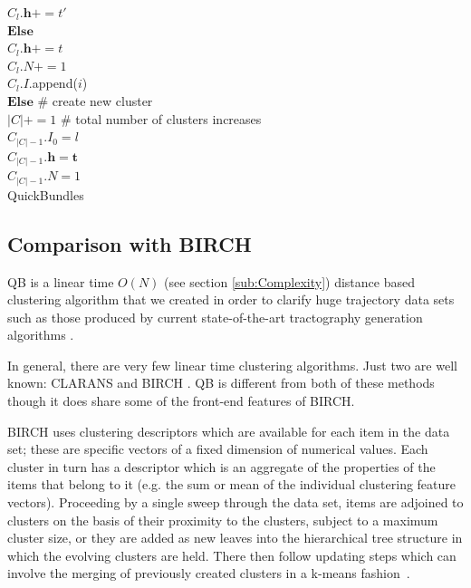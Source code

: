 \documentclass[preprint,authoryear,a4paper,10pt,onecolumn]{elsarticle}
\begin{document}
\begin{appendices}
\begin{algorithm}
\hspace*{4em} $C_{l}.\mathbf{h}+=t'$\\
\hspace*{2em} $\textbf{Else}$ \\
\hspace*{4em} $C_{l}.\mathbf{h}+=t$\\
\hspace*{2em} $C_{l}.N+=1$\\
\hspace*{2em} $C_{l}.I$.append($i$)\\
$\textbf{Else}$ \# create new cluster\\
\hspace*{2em} $|C|+=1$ \# total number of clusters increases\\
\hspace*{2em} $C_{|C|-1}.I_{0}=l$\\
\hspace*{2em} $C_{|C|-1}.\mathbf{h}=\mathbf{t}$\\
\hspace*{2em} $C_{|C|-1}.N=1$\\
\caption{QuickBundles}

\label{Alg:QuickBundles}
\end{algorithm}

\subsection{Comparison with BIRCH}

QB is a linear time $O(N)$ (see section \ref{sub:Complexity}) distance
based clustering algorithm that we created in order to clarify huge
trajectory data sets such as those produced by current state-of-the-art
tractography generation algorithms \citep{Parker2003,WWS+08}.

In general, there are very few linear time clustering algorithms. Just
two are well known: CLARANS \citep{ng2002clarans} and BIRCH
\citep{zhang1997birch}. QB is different from both of these methods
though it does share some of the front-end features of BIRCH.

BIRCH uses clustering descriptors which are available for each item in
the data set; these are specific vectors of a fixed dimension of
numerical values. Each cluster in turn has a descriptor which is an
aggregate of the properties of the items that belong to it (e.g. the sum
or mean of the individual clustering feature vectors). Proceeding by a
single sweep through the data set, items are adjoined to clusters on the
basis of their proximity to the clusters, subject to a maximum cluster
size, or they are added as new leaves into the hierarchical tree
structure in which the evolving clusters are held. There then follow
updating steps which can involve the merging of previously created
clusters in a k-means
fashion~\citep{steinhaus1956division,macqueen1967some}.


\end{appendices}
\end{document}
